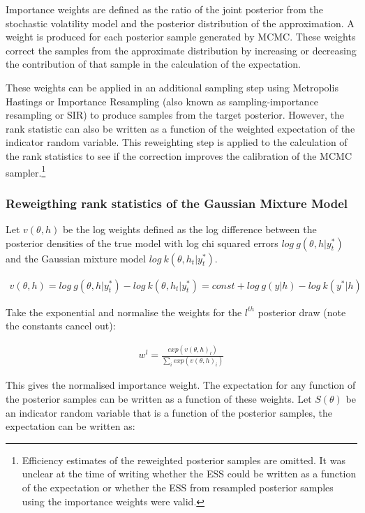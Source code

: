 \documentclass[12pt, a4paper]{article}
\begin{document}
    Importance weights are defined as the ratio of the joint posterior from the stochastic volatility model and the posterior distribution of the approximation. A weight is produced for each posterior sample generated by MCMC. These weights correct the samples from the approximate distribution by increasing or decreasing the contribution of that sample in the calculation of the expectation. 

    These weights can be applied in an additional sampling step using Metropolis Hastings or Importance Resampling (also known as sampling-importance resampling or SIR) to produce samples from the target posterior. However, the rank statistic can also be written as a function of the weighted expectation of the indicator random variable. This reweighting step is applied to the calculation of the rank statistics to see if the correction improves the calibration of the MCMC sampler.\footnote{Efficiency estimates of the reweighted posterior samples are omitted. It was unclear at the time of writing whether the ESS could be written as a function of the expectation or whether the ESS from resampled posterior samples using the importance weights were valid.}

    \subsubsection{Reweigthing rank statistics of the Gaussian Mixture Model}
    Let $v(\theta, h)$ be the log weights defined as the log difference between the posterior densities of the true model with log chi squared errors $log\: g(\theta, h | y^{\ast}_t)$ and the Gaussian mixture model $log\:  k(\theta, h_t | y^{\ast}_t)$.

    $$
    \begin{aligned}
        v(\theta, h) = log\: g(\theta, h | y^{\ast}_t) - log\:  k(\theta, h_t | y^{\ast}_t) = const + log\: g(y|h) - log\: k(y^{\ast} | h)
    \end{aligned}
    $$

    Take the exponential and normalise the weights for the $l^{th}$ posterior draw (note the constants cancel out):
    
    $$
    \begin{aligned}
    w^l = \frac{exp(v(\theta, h)_l)}{\sum_i exp(v(\theta, h)_i)}
    \end{aligned}
    $$

    This gives the normalised importance weight. The expectation for any function of the posterior samples can be written as a function of these weights. Let $S(\theta)$ be an indicator random variable that is a function of the posterior samples, the expectation can be written as:
\end{document}

